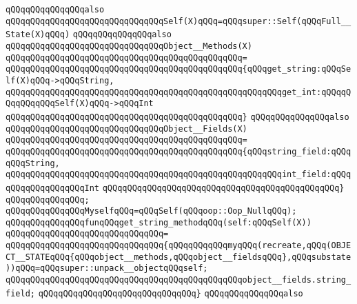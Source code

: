 \verb|qQQqqQQqqQQqqQQqalso|\newline
\verb|qQQqqQQqqQQqqQQqqQQqqQQqqQQqqQQqSelf(X)qQQq=qQQqsuper::Self(qQQqFull__State(X)qQQq)|\newline
\verb|qQQqqQQqqQQqqQQqalso|\newline
\verb|qQQqqQQqqQQqqQQqqQQqqQQqqQQqqQQqObject__Methods(X)|\newline
\verb|qQQqqQQqqQQqqQQqqQQqqQQqqQQqqQQqqQQqqQQqqQQqqQQq=|\newline
\verb|qQQqqQQqqQQqqQQqqQQqqQQqqQQqqQQqqQQqqQQqqQQqqQQq{qQQqget_string:qQQqSelf(X)qQQq->qQQqString,|\newline
\verb|qQQqqQQqqQQqqQQqqQQqqQQqqQQqqQQqqQQqqQQqqQQqqQQqqQQqqQQqget_int:qQQqqQQqqQQqqQQqSelf(X)qQQq->qQQqInt|\newline
\verb|qQQqqQQqqQQqqQQqqQQqqQQqqQQqqQQqqQQqqQQqqQQqqQQq}|\newline
\verb|qQQqqQQqqQQqqQQqalso|\newline
\verb|qQQqqQQqqQQqqQQqqQQqqQQqqQQqqQQqObject__Fields(X)|\newline
\verb|qQQqqQQqqQQqqQQqqQQqqQQqqQQqqQQqqQQqqQQqqQQqqQQq=|\newline
\verb|qQQqqQQqqQQqqQQqqQQqqQQqqQQqqQQqqQQqqQQqqQQqqQQq{qQQqstring_field:qQQqqQQqString,|\newline
\verb|qQQqqQQqqQQqqQQqqQQqqQQqqQQqqQQqqQQqqQQqqQQqqQQqqQQqqQQqint_field:qQQqqQQqqQQqqQQqqQQqInt|\newline
\verb|qQQqqQQqqQQqqQQqqQQqqQQqqQQqqQQqqQQqqQQqqQQqqQQq}|\newline
\verb|qQQqqQQqqQQqqQQq;|\newline
\newline
\verb|qQQqqQQqqQQqqQQqMyselfqQQq=qQQqSelf(qQQqoop::Oop_NullqQQq);|\newline
\newline
\verb|qQQqqQQqqQQqqQQqfunqQQqget_string_methodqQQq(self:qQQqSelf(X))|\newline
\verb|qQQqqQQqqQQqqQQqqQQqqQQqqQQqqQQq=|\newline
\verb|qQQqqQQqqQQqqQQqqQQqqQQqqQQqqQQq{qQQqqQQqqQQqmyqQQq(recreate,qQQq(OBJECT__STATEqQQq{qQQqobject__methods,qQQqobject__fieldsqQQq},qQQqsubstate))qQQq=qQQqsuper::unpack__objectqQQqself;|\newline
\verb|qQQqqQQqqQQqqQQqqQQqqQQqqQQqqQQqqQQqqQQqqQQqqQQqobject__fields.string_field;|\newline
\verb|qQQqqQQqqQQqqQQqqQQqqQQqqQQqqQQq}|\newline
\newline
\verb|qQQqqQQqqQQqqQQqalso|\newline
